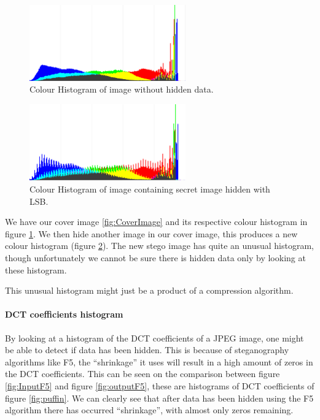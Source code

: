 \begin{figure}
	\centering
	\includegraphics[width=0.6\textwidth]{figures/HistoLSBCat.png}
	\caption{Colour Histogram of image without hidden data.}
	\label{fig:HistoWithoutLSB}
\end{figure}

\begin{figure}
	\centering
	\includegraphics[width=0.6\textwidth]{figures/HistoLSBCatEncrypted.png}
	\caption{Colour Histogram of image containing secret image hidden with LSB.}
	\label{fig:HistoWithLSB}
\end{figure}

We have our cover image \ref{fig:CoverImage} and its respective colour histogram in figure \ref{fig:HistoWithoutLSB}.
We then hide another image in our cover image, this produces a new colour histogram (figure \ref{fig:HistoWithLSB}).
The new stego image has quite an unusual histogram, though unfortunately we cannot be sure there is hidden data only by looking at these histogram.

This unusual histogram might just be a product of a compression algorithm.

\paragraph*{DCT coefficients histogram}
By looking at a histogram of the DCT coefficients of a JPEG image, one might be able to detect if data has been hidden.
This is because of steganography algorithms like F5, the ``shrinkage'' it uses will result in a high amount of zeros in the DCT coefficients.
This can be seen on the comparison between figure \ref{fig:InputF5} and figure \ref{fig:outputF5}, these are histograms of DCT coefficients of figure \ref{fig:puffin}.
We can clearly see that after data has been hidden using the F5 algorithm there has occurred ``shrinkage'', with almost only zeros remaining.


